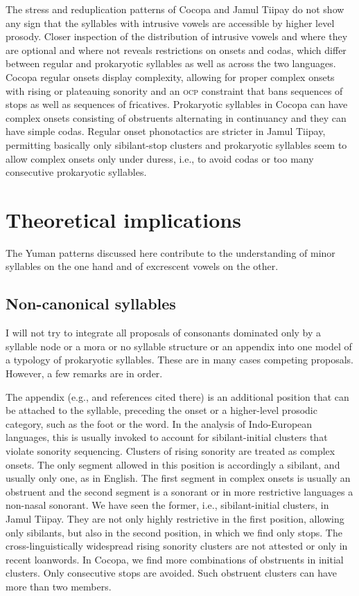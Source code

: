 \documentclass[output=paper,colorlinks,citecolor=brown]{langscibook}
\begin{document}
The stress and reduplication patterns of Cocopa and Jamul Tiipay do not show any sign that the syllables with intrusive vowels are accessible by higher level prosody. Closer inspection of the distribution of intrusive vowels and where they are optional and where not reveals restrictions on onsets and codas, which differ between regular and prokaryotic syllables as well as across the two languages. Cocopa regular onsets display complexity, allowing for proper complex onsets with rising or plateauing sonority and an \textsc{ocp} constraint that bans sequences of stops as well as sequences of fricatives. Prokaryotic syllables in Cocopa can have complex onsets consisting of obstruents alternating in continuancy and they can have simple codas. Regular onset phonotactics are stricter in Jamul Tiipay, permitting basically only sibilant-stop clusters and prokaryotic syllables seem to allow complex onsets only under duress, i.e., to avoid codas or too many consecutive prokaryotic syllables. 

\section{Theoretical implications}\label{implic}

The Yuman patterns discussed here contribute to the understanding of minor syllables on the one hand and of excrescent vowels on the other. 

\subsection{ Non-canonical syllables}

I will not try to integrate all proposals of consonants dominated only by a syllable node or a mora or no syllable structure or an appendix into one model of a typology of prokaryotic syllables. These are in many cases competing proposals. However, a few remarks are in order. 

The appendix (e.g., \citealt{VauxWolfe2009} and references cited there) is an additional position that can be attached to the syllable, preceding the onset or a higher-level prosodic category, such as the foot or the word. In the analysis of Indo-European languages, this is usually invoked to account for sibilant-initial clusters that violate sonority sequencing. Clusters of rising sonority are treated as complex onsets. The only segment allowed in this position is accordingly a sibilant, and usually only one, as in English. The first segment in complex onsets is usually an obstruent and the second segment is a sonorant or in more restrictive languages a non-nasal sonorant. We have seen the former, i.e., sibilant-initial clusters, in Jamul Tiipay. They are not only highly restrictive in the first position, allowing only sibilants, but also in the second position, in which we find only stops. The cross-linguistically widespread rising sonority clusters are not attested or only in recent loanwords. In Cocopa, we find more combinations of obstruents in initial clusters. Only consecutive stops are avoided. Such obstruent clusters can have more than two members. 
\end{document}

